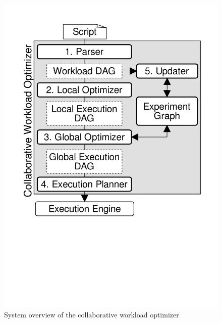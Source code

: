 {\begin{figure}
\centering
\includegraphics[width=\columnwidth]{../images/system-workflow}
\caption{System overview of the collaborative workload optimizer}
\label{system-workflow}
\end{figure}


}
